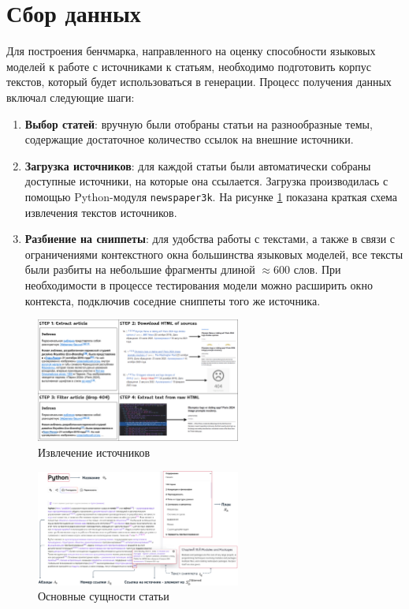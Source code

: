 \documentclass{article}
\theoremstyle{definition}
\theoremstyle{plain}
\begin{document}
\section*{Сбор данных}

Для построения бенчмарка, направленного на оценку способности языковых моделей к работе с источниками к статьям, необходимо подготовить корпус текстов, который будет использоваться в генерации. Процесс получения данных включал следующие шаги:

\begin{enumerate}

    \item \textbf{Выбор статей}: вручную были отобраны статьи на разнообразные темы, 
    содержащие достаточное количество ссылок на внешние источники.
    
    \item \textbf{Загрузка источников}: для каждой статьи были автоматически собраны доступные источники, на которые она ссылается. 
    Загрузка производилась с помощью Python-модуля \texttt{newspaper3k}. 
    На рисунке \ref{fig:source} показана краткая схема извлечения текстов источников.
    
    \item \textbf{Разбиение на сниппеты}: для удобства работы с текстами, а также в связи с ограничениями контекстного окна большинства языковых моделей, 
    все тексты были разбиты на небольшие фрагменты длиной $\approx 600$ слов. 
    При необходимости в процессе тестирования модели можно расширить окно контекста, подключив соседние сниппеты того же источника.

\end{enumerate}

\begin{figure}[htb]
  \centering
  \includegraphics[width=0.6\textwidth]{figures/Source_extract.png}%
  \caption{Извлечение источников}
  \label{fig:source}
\end{figure}

\begin{figure}[htb]
  \centering
  \includegraphics[width=0.6\textwidth]{figures/article_entities.png}%
  \caption{Основные сущности статьи}
  \label{fig:article}
\end{figure}
\end{document}
